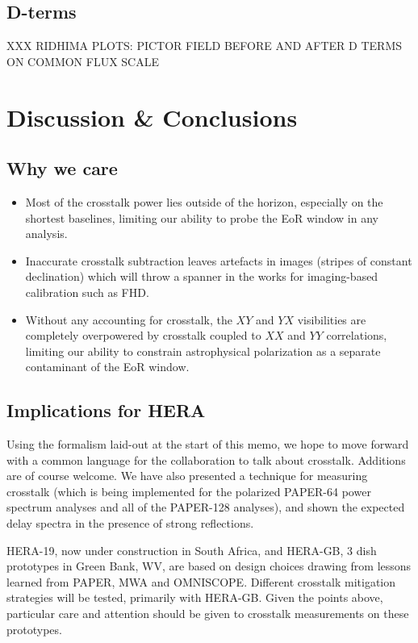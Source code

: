 \documentclass[10pt,a4paper,notitlepage]{article}
\begin{document}
\subsection{D-terms}

XXX RIDHIMA PLOTS: PICTOR FIELD BEFORE AND AFTER D TERMS ON COMMON FLUX SCALE\\

\section{Discussion \& Conclusions}
\label{sec:conc}

\subsection{Why we care}
\begin{itemize}
\item Most of the crosstalk power lies outside of the horizon, especially on the shortest baselines, limiting our ability to probe the EoR window in any analysis.
\item Inaccurate crosstalk subtraction leaves artefacts in images (stripes of constant declination) which will throw a spanner in the works for imaging-based calibration such as FHD.
\item Without any accounting for crosstalk, the $XY$ and $YX$ visibilities are completely overpowered by crosstalk coupled to $XX$ and $YY$ correlations, limiting our ability to constrain astrophysical polarization as a separate contaminant of the EoR window.
\end{itemize}

\subsection{Implications for HERA}

Using the formalism laid-out at the start of this memo, we hope to move forward with a common language for the collaboration to talk about crosstalk. Additions are of course welcome. We have also presented a technique for measuring crosstalk (which is being implemented for the polarized PAPER-64 power spectrum analyses and all of the PAPER-128 analyses), and shown the expected delay spectra in the presence of strong reflections. 

HERA-19, now under construction in South Africa, and HERA-GB, 3 dish prototypes in Green Bank, WV, are based on design choices drawing from lessons learned from PAPER, MWA and OMNISCOPE. Different crosstalk mitigation strategies will be tested, primarily with HERA-GB. Given the points above, particular care and attention should be given to crosstalk measurements on these prototypes.





\end{document}
